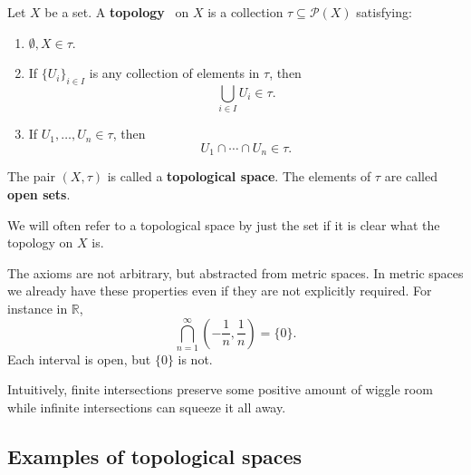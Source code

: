 \documentclass[11pt]{article}
\begin{document}
\begin{defn}
    Let $X$ be a set. A \textbf{topology} 
    on $X$ is a collection $\tau \subseteq 
    \mathcal P(X)$ satisfying: 
    \begin{enumerate}
        \item $\emptyset, X \in \tau$.
        \item If $\{U_i\}_{i\in I}$ is any collection of elements 
            in $\tau$, then 
            \[
                \bigcup_{i\in I}U_i \in \tau. 
            \]
        \item If $U_1, \ldots, U_n \in \tau$, then 
            \[
                U_1 \cap \cdots \cap U_n \in \tau. 
            \]
    \end{enumerate}
    The pair $(X,\tau)$ is called a \textbf{topological space}. 
    The elements of $\tau$ are called \textbf{open sets}.
\end{defn}
We will often refer to a topological space by just 
the set if it is clear what the topology on $X$ is.  

The axioms are not arbitrary, but abstracted from metric spaces. 
In metric spaces we already have these properties even if they 
are not explicitly required. 
For instance in $\mathbb R$, 
\[
    \bigcap_{n=1}^\infty \left(-\frac{1}{n},\frac{1}{n}\right) 
    = \{0\}. 
\]
Each interval is open, but $\{0\}$ is not. 

Intuitively, finite intersections preserve some positive amount of 
wiggle room while infinite intersections can squeeze it all away. 

\subsection*{Examples of topological spaces}
\end{document}
